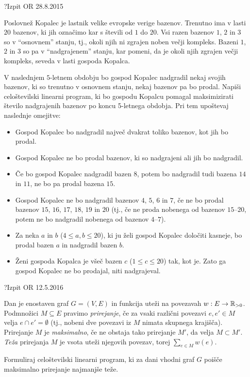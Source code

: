 \begin{naloga}{?}{Izpit OR 28.8.2015}
\begin{vprasanje}
Poslovnež Kopalec je lastnik velike evropske verige bazenov.
Trenutno ima v lasti $20$ bazenov,
ki jih označimo kar s števili od $1$ do $20$.
Vsi razen bazenov $1$, $2$ in $3$ so v ``osnovnem'' stanju,
tj., okoli njih ni zgrajen noben večji kompleks.
Bazeni $1$, $2$ in $3$ so pa v ``nadgrajenem'' stanju,
kar pomeni, da je okoli njih zgrajen večji kompleks,
seveda v lasti gospoda Kopalca.

V naslednjem $5$-letnem obdobju
bo gospod Kopalec nadgradil nekaj svojih bazenov,
ki so trenutno v osnovnem stanju,
nekaj bazenov pa bo prodal.
Napiši celoštevilski linearni program,
ki bo gospodu Kopalcu pomagal maksimizirati število nadgrajenih bazenov
po koncu 5-letnega obdobja. Pri tem upoštevaj naslednje omejitve:
\begin{itemize}
\item Gospod Kopalec bo nadgradil največ dvakrat toliko bazenov,
kot jih bo prodal.
\item Gospod Kopalec ne bo prodal bazenov,
ki so nadgrajeni ali jih bo nadgradil.
\item Če bo gospod Kopalec nadgradil bazen $8$,
potem bo nadgradil tudi bazena $14$ in $11$, ne bo pa prodal bazena $15$.
\item Gospod Kopalec ne bo nadgradil bazenov $4$, $5$, $6$ in $7$,
če ne bo prodal bazenov $15$, $16$, $17$, $18$, $19$ in $20$
(tj., če ne proda nobenega od bazenov $15$--$20$,
potem ne bo nadgradil nobenega od bazenov $4$--$7$).
\item Za neka $a$ in $b$ ($4 \le a, b \le 20$),
ki ju želi gospod Kopalec določiti kasneje,
bo prodal bazen $a$ in nadgradil bazen $b$.
\item Ženi gospoda Kopalca je všeč bazen $c$ ($1 \le c \le 20$) tak, kot je.
Zato ga gospod Kopalec ne bo prodajal, niti nadgrajeval.
\end{itemize}
\end{vprasanje}
\begin{odgovor}
\end{odgovor}
\end{naloga}


\begin{naloga}{?}{Izpit OR 12.5.2016}
\begin{vprasanje}
Dan je enostaven graf $G = (V, E)$
in funkcija uteži na povezavah $w : E \to \mathbb{R}_{>0}$.
Podmnožici $M \subseteq E$ pravimo {\em prirejanje},
če za vsaki različni povezavi $e, e' \in M$ velja $e \cap e' = \emptyset$
(tj., nobeni dve povezavi iz $M$ nimata skupnega krajišča).
Prirejanje $M$ je {\em maksimalno},
če ne obstaja tako prirejanje $M'$, da velja $M \subset M'$.
{\em Teža} prirejanja $M$ je vsota uteži njegovih povezav,
torej $\sum_{e \in M} w(e)$.

Formuliraj celoštevilski linearni program,
ki za dani vhodni graf $G$ poišče maksimalno prirejanje najmanjše teže.
\end{vprasanje}
\begin{odgovor}
\end{odgovor}
\end{naloga}


